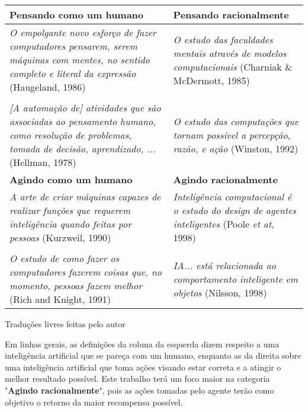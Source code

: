 \begin{tabular}{| p{7cm} | p{7cm} |}
  \hline
  \textbf{Pensando como um humano} & \textbf{Pensando racionalmente} \\ \hline
  \textit{O empolgante novo esforço de fazer computadores pensarem, serem máquinas com mentes, no sentido completo e literal da expressão} \newline (Haugeland, 1986) & \textit{O estudo das faculdades mentais através de modelos computacionais} \newline (Charniak \& McDermott, 1985) \\ & \\ \textit{[A automação de] atividades que são associadas ao pensamento humano, como resolução de problemas, tomada de decisão, aprendizado, ...} \newline (Hellman, 1978) & \textit{O estudo das computações que tornam possível a percepção, razão, e ação} \newline (Winston, 1992) \\ \hline
  \textbf{Agindo como um humano} & \textbf{Agindo racionalmente} \\ \hline
  \textit{A arte de criar máquinas capazes de realizar funções que requerem inteligência quando feitas por pessoas} \newline (Kurzweil, 1990) & \textit{Inteligência computacional é o estudo do design de agentes inteligentes} \newline (Poole \textit{et at}, 1998) \\ & \\ \textit{O estudo de como fazer os computadores fazerem coisas que, no momento, pessoas fazem melhor} \newline (Rich and Knight, 1991) & \textit{IA... está relacionada ao comportamento inteligente em objetos} \newline (Nilsson, 1998) \\ \hline
\end{tabular}

\begin{footnotesize}
Traduções livres feitas pelo autor
\end{footnotesize}

\bigskip Em linhas gerais, as definições da coluna da esquerda dizem respeito a uma inteligência artificial que se pareça com um humano, enquanto as da direita sobre uma inteligência artificial que toma ações visando estar correta e a atingir o melhor resultado possível. Este trabalho terá um foco maior na categoria "\textbf{Agindo racionalmente}", pois as ações tomadas pelo agente terão como objetivo o retorno da maior recompensa possível.

